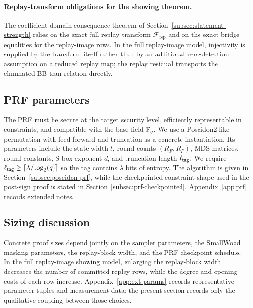 \paragraph{Replay-transform obligations for the showing theorem.}
The coefficient-domain consequence theorem of Section~\ref{subsec:statement-strength} relies on the exact full replay
transform \(\mathcal F_{\mathrm{rep}}\) and on the exact bridge equalities for the replay-image rows. In the full
replay-image model, injectivity is supplied by the transform itself rather than by an additional zero-detection
assumption on a reduced replay map; the replay residual transports the eliminated BB-tran relation directly.

\subsection{PRF parameters}
The PRF must be secure at the target security level, efficiently representable in constraints, and compatible with the
base field \(\mathbb{F}_q\). We use a Poseidon2-like permutation with feed-forward and truncation as a concrete instantiation.
Its parameters include the state width \(t\), round counts \((R_F,R_P)\), MDS matrices, round constants, S-box exponent
\(d\), and truncation length \(\ell_{\mathsf{tag}}\). We require
\(\ell_{\mathsf{tag}}\ge \lceil \lambda/\log_2(q)\rceil\) so the tag contains \(\lambda\) bits of entropy. The algorithm is
given in Section~\ref{subsec:poseidon-prf}, while the checkpointed constraint shape used in the post-sign proof is
stated in Section~\ref{subsec:prf-checkpointed}. Appendix~\ref{app:prf} records extended notes.

\subsection{Sizing discussion}
Concrete proof sizes depend jointly on the sampler parameters, the SmallWood masking parameters, the replay-block width,
and the PRF checkpoint schedule. In the full replay-image showing model, enlarging the replay-block width decreases the
number of committed replay rows, while the degree and opening costs of each row increase. Appendix~\ref{app:ext-params}
records representative parameter tuples and measurement data; the present section records only the qualitative coupling
between those choices.
